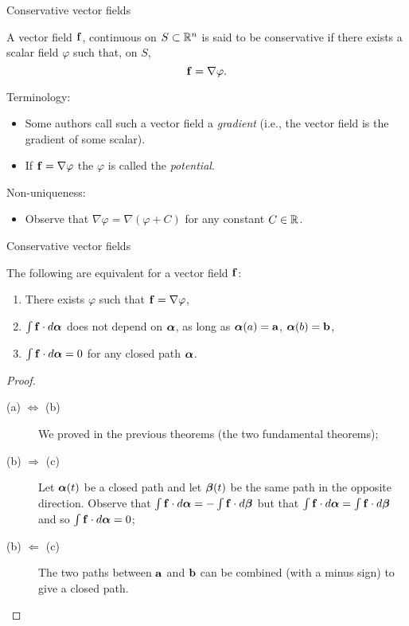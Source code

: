 {Conservative vector fields}

\begin{definition}
    A vector field \(\ff\), continuous on \(S \subset \bR^n\) is said to be conservative if there exists a scalar field \(\varphi\) such that, on \(S\), \[\ff = \nabla \varphi.\]
\end{definition}

{Terminology:}

\begin{itemize}
    \item     Some authors call such a vector field a \emph{gradient} (i.e., the vector field is the gradient of some scalar).
    \item If \(\ff = \nabla \varphi\) the \(\varphi\) is called the \emph{potential}.
\end{itemize}

{Non-uniqueness:}
\begin{itemize}
    \item     Observe that \(\nabla \varphi = \nabla(\varphi + C)\) for any constant \(C \in \bR\).
\end{itemize}






{Conservative vector fields}

\begin{theorem}
    The following are equivalent for a vector field \(\ff\):
    \begin{enumerate}
        \item There exists \(\varphi\) such that \(\ff = \nabla \varphi\),
        \item \(\int \ff \cdot d\aalpha\) does not depend on \(\aalpha\), as long as \(\aalpha(a)=\aa\), \(\aalpha(b)=\bb\),
        \item \(\int \ff \cdot d\aalpha = 0\) for any closed path \(\aalpha\).
    \end{enumerate}
\end{theorem}

\begin{proof}
    \begin{description}
        \item[(a) \(\Leftrightarrow\) (b)] We proved in the previous theorems (the two fundamental theorems);
        \item[(b) \(\Rightarrow\) (c)] Let \(\aalpha(t)\) be a closed path and let \(\bbeta(t)\) be the same path in the opposite direction. Observe that \(\int \ff \cdot d\aalpha = - \int \ff \cdot d \bbeta\) but that \(\int \ff \cdot d \aalpha = \int \ff \cdot d \bbeta\) and so \(\int \ff \cdot d \aalpha = 0\);
        \item[(b) \(\Leftarrow\) (c)] The two paths between \(\aa\) and \(\bb\) can be combined (with a minus sign) to give a closed path.
    \end{description}
\end{proof}






